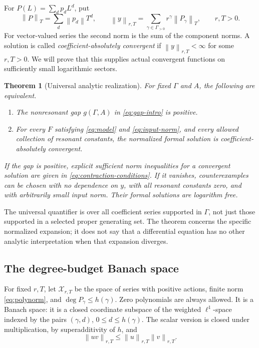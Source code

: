 \documentclass[11pt,a4paper]{article}
\numberwithin{equation}{section}
\newtheorem{theorem}{Theorem}[section]
\theoremstyle{definition}
\theoremstyle{remark}
\newcommand{\G}{\Gamma}
\newcommand{\norm}[1]{\left\lVert #1\right\rVert}
\begin{document}
For \(P(L)=\sum_dp_dL^d\), put
\begin{equation}\label{eq:polynorm}
 \norm{P}_T=\sum_d\norm{p_d}T^d,
 \qquad
 \norm{y}_{r,T}=\sum_{\gamma\in\G_{>0}}r^\gamma\norm{P_\gamma}_T,
 \qquad r,T>0.
\end{equation}
For vector-valued series the second norm is the sum of the component
norms. A solution is called \emph{coefficient-absolutely convergent}
if \(\norm{y}_{r,T}<\infty\) for some \(r,T>0\). We will prove that
this supplies actual convergent functions on sufficiently small
logarithmic sectors.

\begin{theorem}[Universal analytic realization]\label{thm:universal}
For fixed \(\G\) and \(A\), the following are equivalent.
\begin{enumerate}[label=\textup{(\roman*)}]
\item The nonresonant gap \(g(\G,A)\) in \eqref{eq:gap-intro} is positive.
\item For every \(F\) satisfying \eqref{eq:model} and
\eqref{eq:input-norm}, and every allowed collection of resonant
constants, the normalized formal solution is coefficient-absolutely
convergent.
\end{enumerate}
If the gap is positive, explicit sufficient norm inequalities for a
convergent solution are given in \eqref{eq:contraction-conditions}.
If it vanishes, counterexamples can be chosen with no dependence on
\(y\), with all resonant constants zero, and with arbitrarily small
input norm. Their formal solutions are logarithm free.
\end{theorem}

The universal quantifier is over all coefficient series supported in
\(\G\), not just those supported in a selected proper generating set.
The theorem concerns the specific normalized expansion; it does not
say that a differential equation has no other analytic interpretation
when that expansion diverges.

\subsection{The degree-budget Banach space}
For fixed \(r,T\), let \(\mathcal X_{r,T}\) be the space of series
with positive actions, finite norm \eqref{eq:polynorm}, and
\(\deg P_\gamma\le h(\gamma)\). Zero polynomials are always allowed.
It is a Banach space: it is a closed coordinate subspace of the
weighted \(\ell^1\)-space indexed by the pairs
\((\gamma,d)\), \(0\le d\le h(\gamma)\).
The scalar version is closed under multiplication, by
superadditivity of \(h\), and
\begin{equation}\label{eq:norm-product}
 \norm{uv}_{r,T}\le\norm{u}_{r,T}\norm{v}_{r,T}.
\end{equation}
\end{document}
